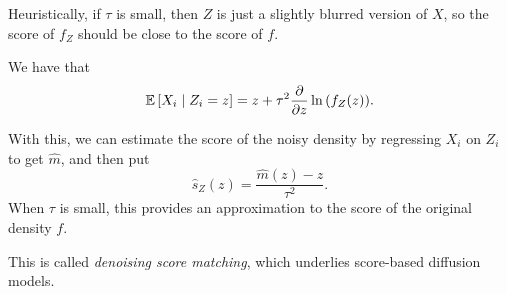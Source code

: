 Heuristically, if $\tau$ is small, then $Z$ is just a slightly blurred version of $X$, so the score of $f_Z$ should be close to the score of $f$.

\begin{proposition}
	We have that \[
		\mathbb{E}\left[X_i \mid Z_i = z\right]  = z + \tau^2 \frac{\partial}{\partial z} \ln{\left(f_Z(z)\right)}
	.\] 
\end{proposition}

With this, we can estimate the score of the noisy density by regressing $X_i$ on $Z_i$ to get $\hat{m}$, and then put \[
	\hat{s}_Z(z) = \frac{\hat{m}(z) - z}{\tau^2}
.\] 
When $\tau$ is small, this provides an approximation to the score of the original density $f$.

This is called \emph{denoising score matching}, which underlies score-based diffusion models.
